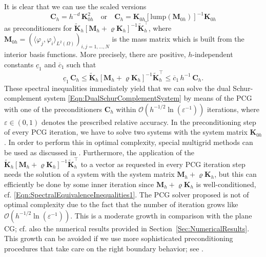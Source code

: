 \documentclass{article}
\numberwithin{equation}{section}
\begin{document}
It is clear that we can use the scaled versions 
\begin{equation}\label{Eqn:Preconditioners} 
  \mathbf{C}_h = h^{-d} \, \mathbf{K}_{0h}^2 \quad \mbox{or} \quad
  \mathbf{C}_h = \mathbf{K}_{0h} [\mbox{lump}(\mathbf{M}_{0h})]^{-1}
  \mathbf{K}_{0h}  
\end{equation}
as preconditioners for $\widetilde{\mathbf{K}}_h
[\mathbf{M}_h+\varrho \mathbf{K}_h]^{-1} \widetilde{\mathbf{K}}_h^\top$,
where $\mathbf{M}_{0h} =
(\langle \varphi_j,  \varphi_i \rangle_{L^2(\Omega)})_{i,j=1,\ldots,N}$ 
is the mass matrix which is built from the interior basis functions.
More precisely, there are 
positive, $h$-independent constants
$\underline{c}_1$ and $\overline{c}_1$ such that
\begin{equation}\label{Eqn:SpectralEquivalenceInequalities3} 
  \underline{c}_1  \, \mathbf{C}_h \le
  \widetilde{\mathbf{K}}_h [\mathbf{M}_h+\varrho \mathbf{K}_h]^{-1}
  \widetilde{\mathbf{K}}_h^\top \le
  \overline{c}_1 \, h^{-1} \, \mathbf{C}_h. 
\end{equation}
These spectral inequalities immediately yield that we can solve 
the dual Schur-complement system \eqref{Eqn:DualSchurComplementSystem} 
by means of the PCG with one of the preconditioners $\mathbf{C}_h$
within ${\mathcal{O}}(h^{-1/2} \ln(\varepsilon^{-1}))$ iterations,
where $\varepsilon \in (0,1)$ denotes the prescribed relative accuracy.
In the preconditioning step of every PCG iteration, we have to solve two
systems with the system matrix $\mathbf{K}_{0h}$. In order to perform this
in optimal complexity, special multigrid methods can be used as discussed
in \cite{BraessPeisker:1986IMAJNA}. Furthermore, the application of the 
$\widetilde{\mathbf{K}}_h [\mathbf{M}_h+\varrho \mathbf{K}_h]^{-1}
\widetilde{\mathbf{K}}_h^\top$ to a vector as requested in every PCG
iteration step needs the solution of a system with the system matrix
$\mathbf{M}_h+\varrho \mathbf{K}_h$, but this can efficiently be done by
some inner iteration since $\mathbf{M}_h+\varrho \mathbf{K}_h$
is well-conditioned, cf. \eqref{Eqn:SpectralEquivalenceInequalities1}.
The PCG solver proposed is not of optimal complexity due to the fact that 
the number of iteration grows like
${\mathcal{O}}(h^{-1/2} \ln(\varepsilon^{-1}))$. This is a moderate growth
in comparison with the plane CG; cf. also the numerical results provided
in Section~\ref{Sec:NumericalResults}.
This growth can be avoided if we use more 
sophisticated
preconditioning 
procedures that take care on the right boundary behavior; see
\cite{ArioliLoghin2009SINUM,GlowinskiPironneau:1979SIAMRev,
JohnSteinbach2013Bericht4,Peisker1988M2AN}.
\end{document}
